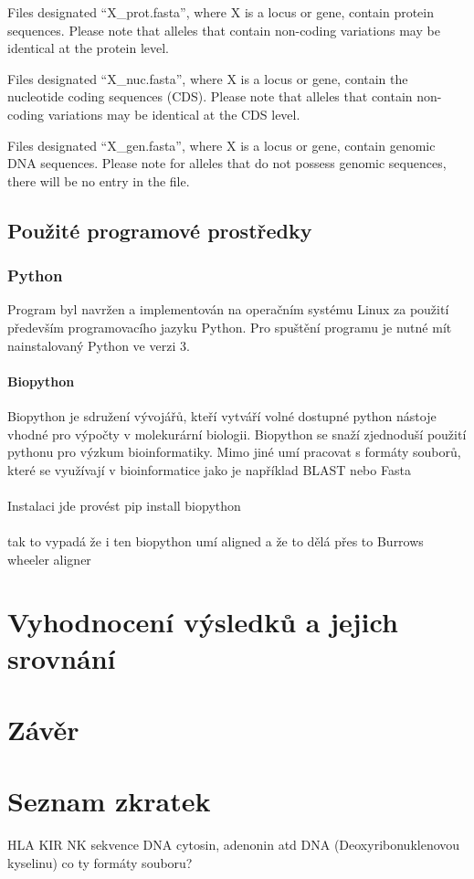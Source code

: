 \documentclass[czech,DP]{thesiskiv}
\numberwithin{equation}{section}
\begin{document}
Files designated “X\_prot.fasta”, where X is a locus or gene, contain protein sequences. Please note that alleles that contain non-coding variations may be identical at the protein level. 

Files designated “X\_nuc.fasta”, where X is a locus or gene, contain the nucleotide coding sequences (CDS). Please note that alleles that contain non-coding variations may be identical at the CDS level.

Files designated “X\_gen.fasta”, where X is a locus or gene, contain genomic DNA sequences. Please note for alleles that do not possess genomic sequences, there will be no entry in the file.

\section{Použité programové prostředky}
\subsection{Python}
Program byl navržen a implementován na operačním systému Linux za použití především programovacího jazyku Python. 
 Pro spuštění programu je nutné mít nainstalovaný Python ve verzi 3.
\subsubsection{Biopython}
Biopython je sdružení vývojářů, kteří vytváří volné dostupné python nástoje vhodné pro výpočty v molekurární biologii. Biopython se snaží zjednoduší použití pythonu pro výzkum bioinformatiky. Mimo jiné umí pracovat s formáty souborů, které se využívají v bioinformatice jako je například BLAST nebo Fasta   
\\
\\
Instalaci jde provést pip install biopython
\\
\\

tak to vypadá že i ten biopython umí aligned a že to dělá přes to Burrows wheeler aligner 


\chapter{Vyhodnocení výsledků a jejich srovnání}
\chapter{Závěr}

\chapter{Seznam zkratek}
HLA
KIR
NK
sekvence DNA cytosin, adenonin atd
DNA (Deoxyribonuklenovou kyselinu)
co ty formáty souboru?
\end{document}
